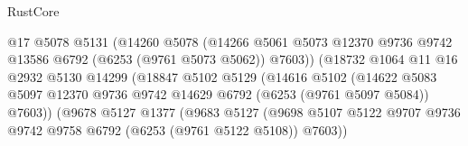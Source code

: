 \begin{lexlean}{RustCore}
\begin{coremodule}
                                      @17
                                      @5078
                                      @5131
                                      (@14260
                                        @5078
                                        (@14266
                                          @5061
                                          @5073
                                          @12370
                                          @9736
                                          @9742
                                          @13586
                                          @6792
                                          (@6253 (@9761 @5073 @5062))
                                          @7603))
                                      (@18732
                                        @1064
                                        @11
                                        @16
                                        @2932
                                        @5130
                                        @14299
                                        (@18847
                                          @5102
                                          @5129
                                          (@14616
                                            @5102
                                            (@14622
                                              @5083
                                              @5097
                                              @12370
                                              @9736
                                              @9742
                                              @14629
                                              @6792
                                              (@6253 (@9761 @5097 @5084))
                                              @7603))
                                          (@9678
                                            @5127
                                            @1377
                                            (@9683
                                              @5127
                                              (@9698
                                                @5107
                                                @5122
                                                @9707
                                                @9736
                                                @9742
                                                @9758
                                                @6792
                                                (@6253 (@9761 @5122 @5108))
                                                @7603))

\end{coremodule}
\end{lexlean}
